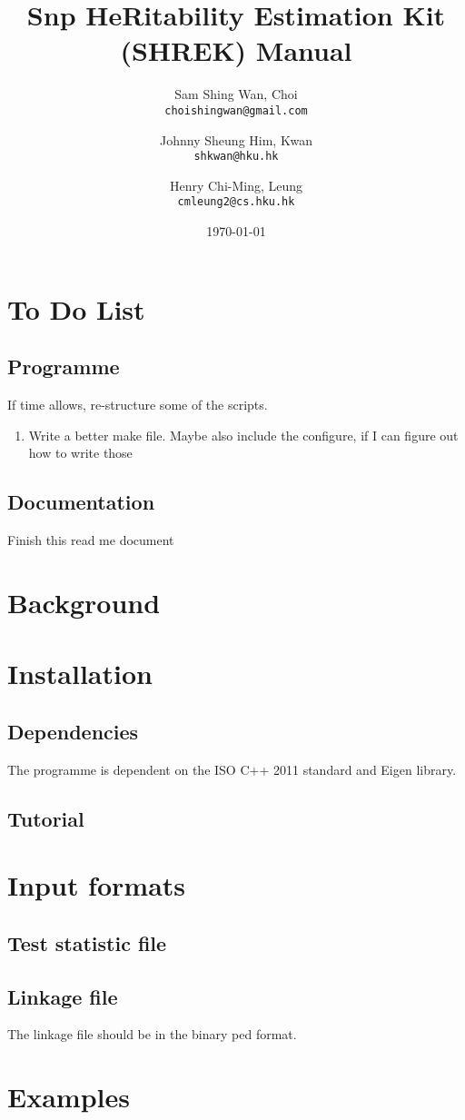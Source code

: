 \documentclass[12pt,a4paper,twoside]{report}
\title{Snp HeRitability Estimation Kit (SHREK) Manual}
\date{\today}
\author{Sam Shing Wan, Choi\\ 
\texttt{choishingwan@gmail.com}
\and
Johnny Sheung Him, Kwan\\
\texttt{shkwan@hku.hk}
\and
Henry Chi-Ming, Leung\\
\texttt{cmleung2@cs.hku.hk}
}
\begin{document}
\maketitle
\tableofcontents
\chapter{To Do List}
\section{Programme}
If time allows, re-structure some of the scripts.
\begin{enumerate}
\item{Write a better make file. Maybe also include the configure, if I can figure out how to write those}
\end{enumerate}
\section{Documentation}
Finish this read me document
\chapter{Background}
\chapter{Installation}
\section{Dependencies}
The programme is dependent on the ISO C++ 2011 standard and Eigen library.
\section{Tutorial}
\chapter{Input formats}
\section{Test statistic file}
\section{Linkage file}
The linkage file should be in the binary ped format. 
\chapter{Examples}
\end{document}
